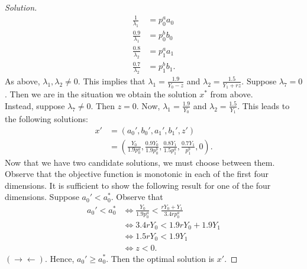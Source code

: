 \documentclass[12pt]{article}
\theoremstyle{definition}
\theoremstyle{remark}
\def\la{\lambda}
\def\contra{\rightarrow \leftarrow}
\begin{document}
\begin{proof}[Solution]
\begin{align*}
    \frac{1}{\la_1} &= p_0^aa_0 \\
    \frac{0.9}{\la_1} &= p_0^bb_0 \\
    \frac{0.8}{\la_2} &= p_1^aa_1 \\
    \frac{0.7}{\la_2} &= p_1^bb_1.
  \end{align*}
  As above, $\la_1, \la_2 \neq 0$. This implies that $\la_1 = \frac{1.9}{Y_0 - z}$ and $\la_2 = \frac{1.5}{Y_1 + rz}$.
  Suppose $\la_7 = 0$. Then we are in the situation we obtain the solution $x^*$ from above. \\
  Instead, suppose $\la_7 \neq 0$. Then $z = 0$. Now, $\la_1 = \frac{1.9}{Y_0}$ and $\la_2 = \frac{1.5}{Y_1}$. This leads to the following solutions:
  \begin{align*}
    x' &= (a_0', b_0', a_1', b_1', z') \\
    &= \left(\frac{Y_0}{1.9p_0^a}, \frac{0.9Y_0}{1.9p_0^b}, \frac{0.8 Y_1}{1.5p_1^a}, \frac{0.7 Y_1}{p_1^b}, 0\right).
  \end{align*}
  Now that we have two candidate solutions, we must choose between them. Observe that the objective function is monotonic in each of the first four dimensions. It is sufficient to show the following result for one of the four dimensions. Suppose $a_0' < a_0^*$. Observe that
  \begin{align*}
    a_0' < a_0^* &\iff \frac{Y_0}{1.9 p_0^a} < \frac{rY_0 + Y_1}{3.4rp_0^a} \\
    &\iff 3.4rY_0 < 1.9rY_0 + 1.9Y_1 \\
    &\iff 1.5rY_0 < 1.9Y_1 \\
    &\iff z < 0.
  \end{align*}
  $(\contra)$. Hence, $a_0' \geq a_0^*$. Then the optimal solution is $x'$.
\end{proof}
%
%
\end{document}
